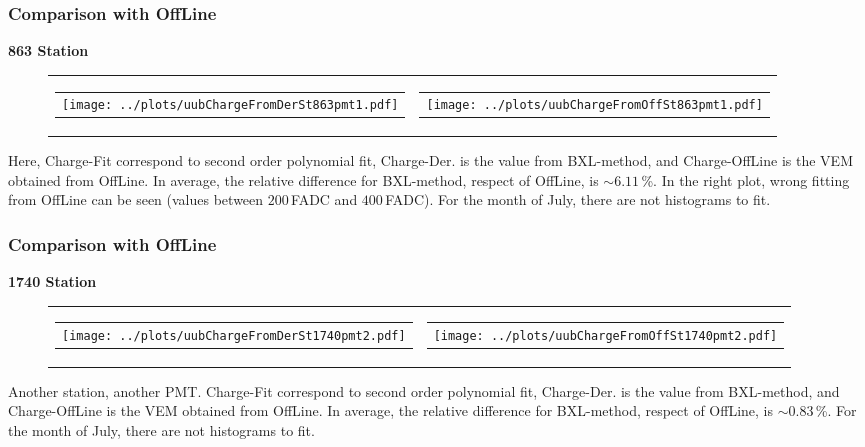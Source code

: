 \documentclass[aspectratio=169]{beamer}
\begin{document}
\begin{frame} 
  \frametitle{Comparison with OffLine}
  {\bf 863 Station}
  \begin{figure}
    \centering
    \begin{tabularx}{\textwidth}{CC}
      \begin{tabular}{l}
        \texttt{[image: ../plots/uubChargeFromDerSt863pmt1.pdf]}
      \end{tabular}
      &
      \begin{tabular}{l}
        \texttt{[image: ../plots/uubChargeFromOffSt863pmt1.pdf]}
      \end{tabular}
    \end{tabularx}
  \end{figure}
  Here, Charge-Fit correspond to second order polynomial fit,
  Charge-Der. is the value from BXL-method, and Charge-OffLine is
  the VEM obtained from OffLine. In average, the relative
  difference for BXL-method, respect of OffLine, is $\sim
  6.11$\,\%. In the right plot, wrong fitting from OffLine can be
  seen (values between $200$\,FADC and $400$\,FADC). For the
  month of July, there are not histograms to fit.
\end{frame}

\begin{frame} 
  \frametitle{Comparison with OffLine}
  {\bf 1740 Station}
  \begin{figure}
    \centering
    \begin{tabularx}{\textwidth}{CC}
      \begin{tabular}{l}
        \texttt{[image: ../plots/uubChargeFromDerSt1740pmt2.pdf]}
      \end{tabular}
      &
      \begin{tabular}{l}
        \texttt{[image: ../plots/uubChargeFromOffSt1740pmt2.pdf]}
      \end{tabular}
    \end{tabularx}
  \end{figure}
  Another station, another PMT. Charge-Fit correspond to second
  order polynomial fit, Charge-Der. is the value from BXL-method,
  and Charge-OffLine is the VEM obtained from OffLine. In
  average, the relative difference for BXL-method, respect of
  OffLine, is $\sim 0.83$\,\%. For the month of July, there are
  not histograms to fit.
\end{frame}
\end{document}
